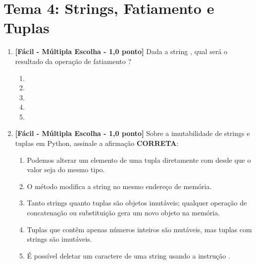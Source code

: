 \section*{Tema 4: Strings, Fatiamento e Tuplas}

\begin{enumerate}[label=\textbf{Q\arabic*.}, start=39]

\item \textbf{[Fácil - Múltipla Escolha - 1,0 ponto]} Dada a string , qual será o resultado da operação de fatiamento ?

\begin{enumerate}[label=\textbf{(\Alph*)}]
    \item {}
    \item {}
    \item {}
    \item {}
    \item {}
\end{enumerate}



\vspace{0.4cm}

\item \textbf{[Fácil - Múltipla Escolha - 1,0 ponto]} Sobre a imutabilidade de strings e tuplas em Python, assinale a afirmação \textbf{CORRETA}:

\begin{enumerate}[label=\textbf{(\Alph*)}]
    \item Podemos alterar um elemento de uma tupla diretamente com  desde que o valor seja do mesmo tipo.
    \item O método  modifica a string  no mesmo endereço de memória.
    \item Tanto strings quanto tuplas são objetos imutáveis; qualquer operação de concatenação ou substituição gera um novo objeto na memória.
    \item Tuplas que contêm apenas números inteiros são mutáveis, mas tuplas com strings são imutáveis.
    \item É possível deletar um caractere de uma string usando a instrução .
\end{enumerate}



\vspace{0.4cm}


\end{enumerate}
